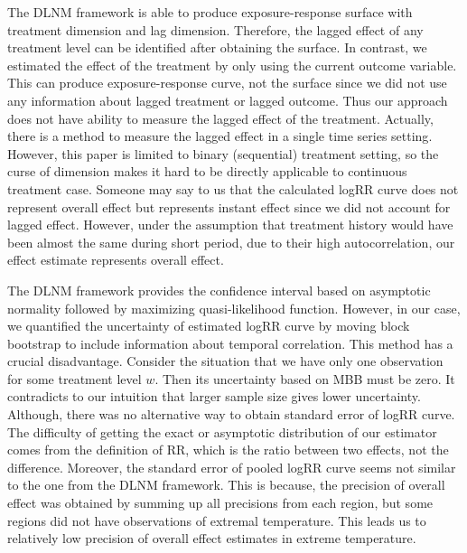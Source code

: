\documentclass[12pt]{article}
\begin{document}
The DLNM framework is able to produce 
exposure-response surface with treatment dimension and lag dimension.
Therefore, the lagged effect of any treatment level can be identified after obtaining the surface.
In contrast, we estimated the effect of the treatment by only using the current outcome variable.
This can produce exposure-response curve, not the surface 
since we did not use any information about lagged treatment or lagged outcome.
Thus our approach does not have ability to measure the lagged effect of the treatment.
Actually, there is a method to measure the lagged effect in a single time series setting\cite{bojinov2019}.
However, this paper is limited to binary (sequential) treatment setting,
so the curse of dimension makes it hard to be directly applicable to continuous treatment case.
Someone may say to us that the calculated logRR curve does not represent overall effect 
but represents instant effect since we did not account for lagged effect.
However, under the assumption that 
treatment history would have been almost the same during short period, due to their high autocorrelation,
our effect estimate represents overall effect.


The DLNM framework provides the confidence interval based on asymptotic normality 
followed by maximizing quasi-likelihood function.
However, in our case, we quantified the uncertainty of estimated logRR curve by moving block bootstrap
to include information about temporal correlation.
This method has a crucial disadvantage.
Consider the situation that we have only one observation for some treatment level $w$.
Then its uncertainty based on MBB must be zero.
It contradicts to our intuition that larger sample size gives lower uncertainty.
Although, there was no alternative way to obtain standard error of logRR curve.
The difficulty of getting the exact or asymptotic distribution of our estimator
comes from the definition of RR, which is the ratio between two effects, not the difference.
Moreover, the standard error of pooled logRR curve seems not similar to the one from the DLNM framework.
This is because,
the precision of overall effect was obtained by summing up all precisions from each region,
but some regions did not have observations of extremal temperature.
This leads us to relatively low precision of overall effect estimates in extreme temperature.
\end{document}
